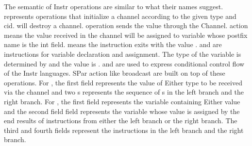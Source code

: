 The semantic of Instr operations are similar to what their names suggest.  represents operations that initialize a channel according to the given type and cid. \linebreak {} will destroy a channel.  operation sends the value  through the Channel.  action means the value received in the channel will be assigned to variable whose postfix name is the int field.  means the instruction exits with the value .  and  are instructions for variable declaration and assignment. The type of the variable is determined by  and the value is .  and  are used to express conditional control flow of the Instr languages. SPar action like broadcast are built on top of these operations. For , the first field represents the value of Either type to be received via the channel and two s represents the sequence of s in the left branch and the right branch. For , the first field represents the variable containing Either value and the second field field represents the variable whose value is assigned by the end results of instructions from either the left branch or the right branch. The third and fourth fields represent the instructions in the left branch and the right branch.

